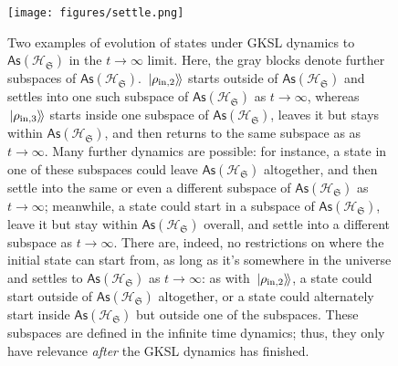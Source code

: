 \documentclass[preprints,article,accept,moreauthors,pdftex]{Definitions/mdpi}
\begin{document}
\begin{paracol}{2}
\begin{figure}[h]
    \centerline{\texttt{[image: figures/settle.png]}}
    \caption{Two examples of evolution of states under GKSL dynamics to $\mathsf{As}\left(\mathcal{H}_{\mathfrak{S}}\right)$ in the $t\rightarrow\infty$ limit. Here, the gray blocks denote further subspaces of $\mathsf{As}\left(\mathcal{H}_{\mathfrak{S}}\right)$. $\left.\ket{\rho_{\mathrm{in},2}}\!\right\rangle$ starts outside of $\mathsf{As}\left(\mathcal{H}_{\mathfrak{S}}\right)$ and settles into one such subspace of $\mathsf{As}\left(\mathcal{H}_{\mathfrak{S}}\right)$ as $t \rightarrow \infty$, whereas $\left.\ket{\rho_{\mathrm{in},3}}\!\right\rangle$ starts inside one subspace of $\mathsf{As}\left(\mathcal{H}_{\mathfrak{S}}\right)$, leaves it but stays within $\mathsf{As}\left(\mathcal{H}_{\mathfrak{S}}\right)$, and then returns to the same subspace as as $t \rightarrow \infty$. Many further dynamics are possible: for instance, a state in one of these subspaces could leave $\mathsf{As}\left(\mathcal{H}_{\mathfrak{S}}\right)$ altogether, and then settle into the same or even a different subspace of $\mathsf{As}\left(\mathcal{H}_{\mathfrak{S}}\right)$ as $t \rightarrow \infty$; meanwhile, a state could start in a subspace of $\mathsf{As}\left(\mathcal{H}_{\mathfrak{S}}\right)$, leave it but stay within $\mathsf{As}\left(\mathcal{H}_{\mathfrak{S}}\right)$ overall, and settle into a different subspace as $t \rightarrow \infty$. There are, indeed, no restrictions on where the initial state can start from, as long as it's somewhere in the universe and settles to $\mathsf{As}\left(\mathcal{H}_{\mathfrak{S}}\right)$ as $t \rightarrow \infty$: as with $\left.\ket{\rho_{\mathrm{in},2}}\!\right\rangle$, a state could start outside of $\mathsf{As}\left(\mathcal{H}_{\mathfrak{S}}\right)$ altogether, or a state could alternately start inside $\mathsf{As}\left(\mathcal{H}_{\mathfrak{S}}\right)$ but outside one of the subspaces. These subspaces are defined in the infinite time dynamics; thus, they only have relevance \emph{after} the GKSL dynamics has finished. \label{fig:settle}}
\end{figure}


\end{paracol}
\end{document}
